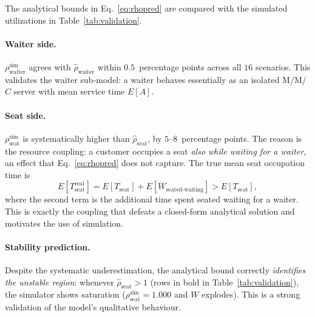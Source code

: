 \documentclass[11pt,a4paper]{article}
\begin{document}
The analytical bounds in Eq.~\eqref{eq:rhopred} are compared with the
simulated utilizations in Table~\ref{tab:validation}.

\paragraph{Waiter side.}
$\rho_{\text{waiter}}^{\text{sim}}$ agrees with $\hat\rho_{\text{waiter}}$
within $0.5$~percentage points across all $16$ scenarios. This validates
the waiter sub-model: a waiter behaves essentially as an isolated
M/M/$C$ server with mean service time $E[A]$.

\paragraph{Seat side.}
$\rho_{\text{seat}}^{\text{sim}}$ is systematically higher than
$\hat\rho_{\text{seat}}$, by $5$--$8$~percentage points. The reason is
the resource coupling: a customer occupies a seat \emph{also while
waiting for a waiter}, an effect that
Eq.~\eqref{eq:rhopred} does not capture. The true mean seat
occupation time is
\[
E[T_{\text{seat}}^{\text{real}}]
   = E[T_{\text{seat}}] + E[W_{\text{seated-waiting}}]
   > E[T_{\text{seat}}],
\]
where the second term is the additional time spent seated waiting for
a waiter. This is exactly the coupling that defeats a closed-form
analytical solution and motivates the use of simulation.

\paragraph{Stability prediction.}
Despite the systematic underestimation, the analytical bound correctly
\emph{identifies the unstable region}: whenever
$\hat\rho_{\text{seat}} > 1$ (rows in bold in
Table~\ref{tab:validation}), the simulator shows saturation
($\rho_{\text{seat}}^{\text{sim}} = 1.000$ and $W$ explodes).
This is a strong validation of the model's qualitative behaviour.
\end{document}
